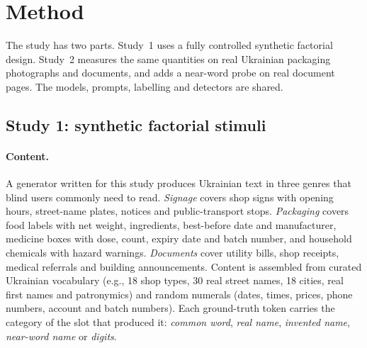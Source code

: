 \section{Method}\label{sec:method}

The study has two parts. Study~1 uses a fully controlled synthetic factorial design. Study~2 measures the same quantities on real Ukrainian packaging photographs and documents, and adds a near-word probe on real document pages. The models, prompts, labelling and detectors are shared.

\subsection{Study 1: synthetic factorial stimuli}\label{sec:synth}

\paragraph{Content.} A generator written for this study produces Ukrainian text in three genres that blind users commonly need to read. \emph{Signage} covers shop signs with opening hours, street-name plates, notices and public-transport stops. \emph{Packaging} covers food labels with net weight, ingredients, best-before date and manufacturer, medicine boxes with dose, count, expiry date and batch number, and household chemicals with hazard warnings. \emph{Documents} cover utility bills, shop receipts, medical referrals and building announcements. Content is assembled from curated Ukrainian vocabulary (e.g., 18 shop types, 30 real street names, 18 cities, real first names and patronymics) and random numerals (dates, times, prices, phone numbers, account and batch numbers). Each ground-truth token carries the category of the slot that produced it: \emph{common word}, \emph{real name}, \emph{invented name}, \emph{near-word name} or \emph{digits}.

